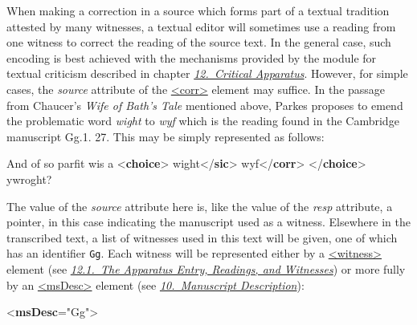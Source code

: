 When making a correction in a source which forms part of a textual tradition attested by many witnesses, a textual editor will sometimes use a reading from one witness to correct the reading of the source text. In the general case, such encoding is best achieved with the mechanisms provided by the module for textual criticism described in chapter \textit{\hyperref[TC]{12.\ Critical Apparatus}}. However, for simple cases, the {\itshape source} attribute of the \hyperref[TEI.corr]{<corr>} element may suffice. In the passage from Chaucer's \textit{Wife of Bath's Tale} mentioned above, Parkes proposes to emend the problematic word \textit{wight} to \textit{wyf} which is the reading found in the Cambridge manuscript Gg.1. 27. This may be simply represented as follows: \par\bgroup{}\exampleFont \begin{shaded}\noindent\mbox{} And of so\mbox{}\newline 
 parfit wis a {<\textbf{choice}>}\mbox{}\newline 
{}wight{</\textbf{sic}>}\mbox{}\newline 
{}wyf{</\textbf{corr}>}\mbox{}\newline 
{</\textbf{choice}>} ywroght?\end{shaded}\egroup\par \noindent  The value of the {\itshape source} attribute here is, like the value of the {\itshape resp} attribute, a pointer, in this case indicating the manuscript used as a witness. Elsewhere in the transcribed text, a list of witnesses used in this text will be given, one of which has an identifier \texttt{Gg}. Each witness will be represented either by a \hyperref[TEI.witness]{<witness>} element (see \textit{\hyperref[TCAPLL]{12.1.\ The Apparatus Entry, Readings, and Witnesses}}) or more fully by an \hyperref[TEI.msDesc]{<msDesc>} element (see \textit{\hyperref[MS]{10.\ Manuscript Description}}): \par\bgroup{}\exampleFont \begin{shaded}\noindent\mbox{}{<\textbf{msDesc}\hspace*{1em}{xml:id}="{Gg}">}\mbox{}\newline 

\end{shaded}
